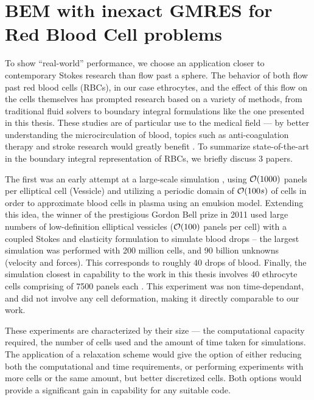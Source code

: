 
\chapter{BEM with inexact GMRES for Red Blood Cell problems}\label{chapter:rbc}
\thispagestyle{myheadings}

\graphicspath{{RBC/}}

To show ``real-world'' performance, we choose an application closer to contemporary Stokes {\bem} research than flow past a sphere. The behavior of both flow past red blood cells (RBCs), in our case ethrocytes, and the effect of this flow on the cells themselves has prompted research based on a variety of methods, from traditional fluid solvers to boundary integral formulations like the one presented in this thesis. These studies are of particular use to the medical field --- by better understanding the microcirculation of blood, topics such as anti-coagulation therapy and stroke research would greatly benefit \cite{RahimianETal2010}. To summarize state-of-the-art in the boundary integral representation of RBCs, we briefly discuss 3 papers.

The first was an early attempt at a large-scale simulation \cite{zinchenko2003}, using $\mathcal{O}(1000)$ panels per elliptical cell (Vessicle) and utilizing a periodic domain of $\mathcal{O}(100s)$ of cells in order to approximate blood cells in plasma using an emulsion model. Extending this idea, the winner of the prestigious Gordon Bell prize in 2011 \cite{RahimianETal2010} used large numbers of low-definition elliptical vessicles ($\mathcal{O}(100)$ panels per cell) with a coupled Stokes and elasticity formulation to simulate blood drops -- the largest simulation was performed with 200 million cells, and 90 billion unknowns (velocity and forces). This corresponds to roughly 40 drops of blood. Finally, the simulation closest in capability to the work in this thesis involves 40 ethrocyte cells comprising of 7500 panels each \cite{Liu2009}. This experiment was non time-dependant, and did not involve any cell deformation, making it directly comparable to our work.

These experiments are characterized by their size --- the computational capacity required, the number of cells used and the amount of time taken for simulations. The application of a relaxation scheme would give the option of either reducing both the computational and time requirements, or performing experiments with more cells or the same amount, but better discretized cells. Both options would provide a significant gain in capability for any suitable code.

